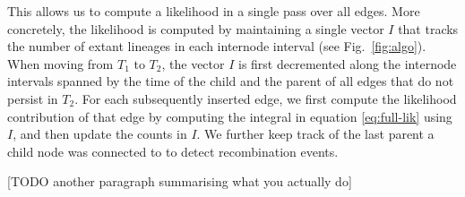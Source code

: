 \documentclass{article}
\newcommand{\argweaver}[0]{\texttt{ARGweaver}}
\begin{document}
This allows us to compute a likelihood in a single pass over all edges.
More concretely, the likelihood is computed by maintaining a single vector $I$ that tracks
the number of extant lineages in each internode interval (see Fig.~\ref{fig:algo}).
When moving from $T_1$ to $T_2$, the vector $I$ is first decremented along 
the internode intervals
spanned by the time of the child and the parent of all edges that do not persist in $T_2$.
For each subsequently inserted edge, we first compute the likelihood contribution
of that edge by computing the integral
in equation \eqref{eq:full-lik} using $I$, and then update the counts in $I$.
We further keep track of
the last parent a child node was connected to to detect recombination events.

[TODO another paragraph summarising what you actually do]


\end{document}
